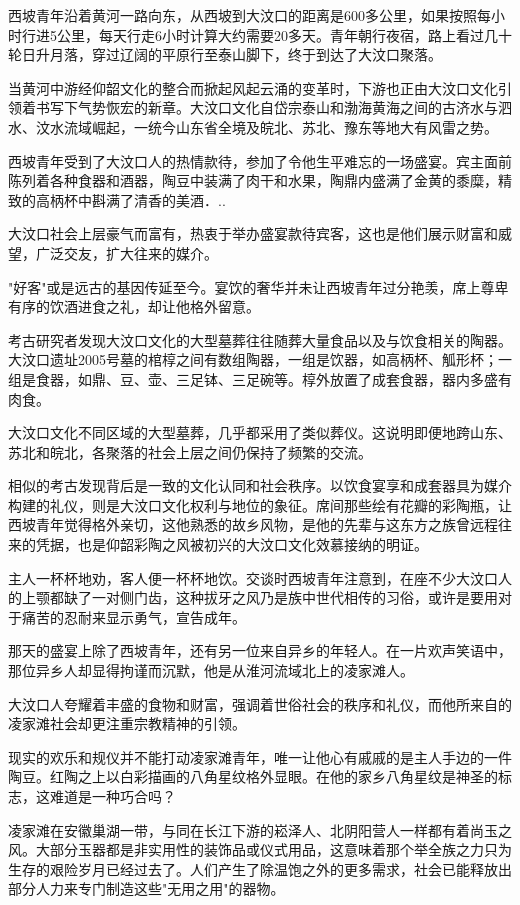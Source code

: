 西坡青年沿着黄河一路向东，从西坡到大汶口的距离是600多公里，如果按照每小时行进5公里，每天行走6小时计算大约需要20多天。青年朝行夜宿，路上看过几十轮日升月落，穿过辽阔的平原行至泰山脚下，终于到达了大汶口聚落。

当黄河中游经仰韶文化的整合而掀起风起云涌的变革时，下游也正由大汶口文化引领着书写下气势恢宏的新章。大汶口文化自岱宗泰山和渤海黄海之间的古济水与泗水、汶水流域崛起，一统今山东省全境及皖北、苏北、豫东等地大有风雷之势。

西坡青年受到了大汶口人的热情款待，参加了令他生平难忘的一场盛宴。宾主面前陈列着各种食器和酒器，陶豆中装满了肉干和水果，陶鼎内盛满了金黄的黍糜，精致的高柄杯中斟满了清香的美酒．..

大汶口社会上层豪气而富有，热衷于举办盛宴款待宾客，这也是他们展示财富和威望，广泛交友，扩大往来的媒介。

"好客"或是远古的基因传延至今。宴饮的奢华并未让西坡青年过分艳羡，席上尊卑有序的饮酒进食之礼，却让他格外留意。

考古研究者发现大汶口文化的大型墓葬往往随葬大量食品以及与饮食相关的陶器。大汶口遗址2005号墓的棺椁之间有数组陶器，一组是饮器，如高柄杯、觚形杯；一组是食器，如鼎、豆、壶、三足钵、三足碗等。椁外放置了成套食器，器内多盛有肉食。

大汶口文化不同区域的大型墓葬，几乎都采用了类似葬仪。这说明即便地跨山东、苏北和皖北，各聚落的社会上层之间仍保持了频繁的交流。

相似的考古发现背后是一致的文化认同和社会秩序。以饮食宴享和成套器具为媒介构建的礼仪，则是大汶口文化权利与地位的象征。席间那些绘有花瓣的彩陶瓶，让西坡青年觉得格外亲切，这他熟悉的故乡风物，是他的先辈与这东方之族曾远程往来的凭据，也是仰韶彩陶之风被初兴的大汶口文化效慕接纳的明证。

主人一杯杯地劝，客人便一杯杯地饮。交谈时西坡青年注意到，在座不少大汶口人的上颚都缺了一对侧门齿，这种拔牙之风乃是族中世代相传的习俗，或许是要用对于痛苦的忍耐来显示勇气，宣告成年。

那天的盛宴上除了西坡青年，还有另一位来自异乡的年轻人。在一片欢声笑语中，那位异乡人却显得拘谨而沉默，他是从淮河流域北上的凌家滩人。

大汶口人夸耀着丰盛的食物和财富，强调着世俗社会的秩序和礼仪，而他所来自的凌家滩社会却更注重宗教精神的引领。

现实的欢乐和规仪并不能打动凌家滩青年，唯一让他心有戚戚的是主人手边的一件陶豆。红陶之上以白彩描画的八角星纹格外显眼。在他的家乡八角星纹是神圣的标志，这难道是一种巧合吗？

凌家滩在安徽巢湖一带，与同在长江下游的崧泽人、北阴阳营人一样都有着尚玉之风。大部分玉器都是非实用性的装饰品或仪式用品，这意味着那个举全族之力只为生存的艰险岁月已经过去了。人们产生了除温饱之外的更多需求，社会已能释放出部分人力来专门制造这些"无用之用"的器物。

